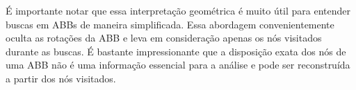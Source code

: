 É importante notar que essa interpretação geométrica é muito útil para entender buscas em ABBs de maneira simplificada. Essa abordagem convenientemente oculta as rotações da ABB e leva em consideração apenas os nós visitados durante as buscas. É bastante impressionante que a disposição exata dos nós de uma ABB não é uma informação essencial para a análise e pode ser reconstruída a partir dos nós visitados.

